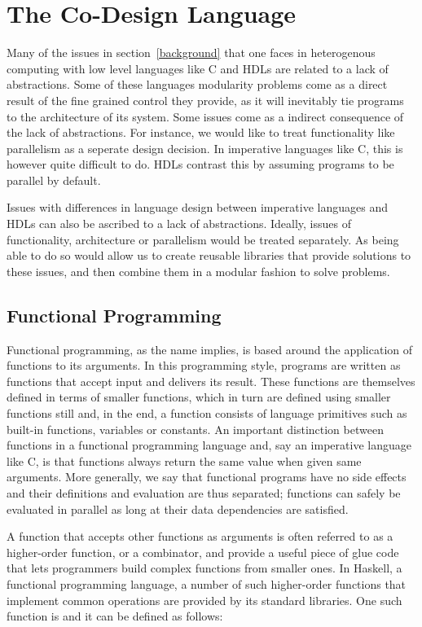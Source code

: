 \section{The Co-Design Language}

Many of the issues in section~\ref{background} that one faces in heterogenous computing with low level languages like C and HDLs are related to a lack of abstractions. Some of these languages modularity problems come as a direct result of the fine grained control they provide, as it will inevitably tie programs to the architecture of its system. Some issues come as a indirect consequence of the lack of abstractions. For instance, we would like to treat functionality like parallelism as a seperate design decision. In imperative languages like C, this is however quite difficult to do. HDLs contrast this by assuming programs to be parallel by default.

Issues with differences in language design between imperative languages and HDLs can also be ascribed to a lack of abstractions. Ideally, issues of functionality, architecture or parallelism would be treated separately. As being able to do so would allow us to create reusable libraries that provide solutions to these issues, and then combine them in a modular fashion to solve problems.

\subsection{Functional Programming}
\label{functional}

Functional programming, as the name implies, is based around the application of functions to its arguments. In this programming style, programs are written as functions that accept input and delivers its result. These functions are themselves defined in terms of smaller functions, which in turn are defined using smaller functions still and, in the end, a function consists of language primitives such as built-in functions, variables or constants. An important distinction between functions in a functional programming language and, say an imperative language like C, is that functions always return the same value when given same arguments. More generally, we say that functional programs have no side effects and their definitions and evaluation are thus separated; functions can safely be evaluated in parallel as long at their data dependencies are satisfied.

A function that accepts other functions as arguments is often referred to as a higher-order function, or a combinator, and provide a useful piece of glue code that lets programmers build complex functions from smaller ones. In Haskell, a functional programming language, a number of such higher-order functions that implement common operations are provided by its standard libraries. One such function is  and it can be defined as follows:

